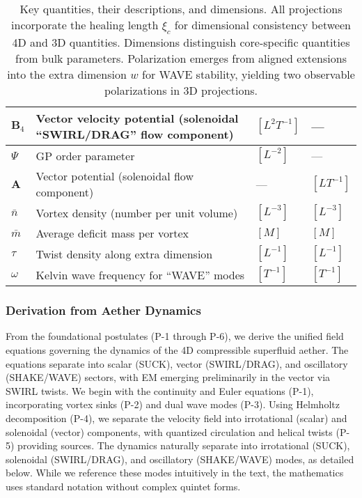 \begin{table}[H]
\begin{tabularx}{\textwidth}{|l|Y|l|l|}
\hline
$\mathbf{B}_4$ & Vector velocity potential (solenoidal ``SWIRL/DRAG'' flow component) & $[L^2 T^{-1}]$ & --- \\
\hline
$\Psi$ & GP order parameter & $[L^{-2}]$ & --- \\
\hline
$\mathbf{A}$ & Vector potential (solenoidal flow component) & --- & $[L T^{-1}]$ \\
\hline
$\bar{n}$ & Vortex density (number per unit volume) & $[L^{-3}]$ & $[L^{-3}]$ \\
\hline
$\bar{m}$ & Average deficit mass per vortex & $[M]$ & $[M]$ \\
\hline
$\tau$ & Twist density along extra dimension & $[L^{-1}]$ & $[L^{-1}]$ \\
\hline
$\omega$ & Kelvin wave frequency for ``WAVE'' modes & $[T^{-1}]$ & $[T^{-1}]$ \\
\hline
\end{tabularx}
\caption{Key quantities, their descriptions, and dimensions. All projections incorporate the healing length $\xi_c$ for dimensional consistency between 4D and 3D quantities. Dimensions distinguish core-specific quantities from bulk parameters. Polarization emerges from aligned extensions into the extra dimension $w$ for WAVE stability, yielding two observable polarizations in 3D projections.}
\label{tab:notation}
\end{table}

\subsubsection{Derivation from Aether Dynamics}

From the foundational postulates (P-1 through P-6), we derive the unified field equations governing the dynamics of the 4D compressible superfluid aether. The equations separate into scalar (SUCK), vector (SWIRL/DRAG), and oscillatory (SHAKE/WAVE) sectors, with EM emerging preliminarily in the vector via SWIRL twists. We begin with the continuity and Euler equations (P-1), incorporating vortex sinks (P-2) and dual wave modes (P-3). Using Helmholtz decomposition (P-4), we separate the velocity field into irrotational (scalar) and solenoidal (vector) components, with quantized circulation and helical twists (P-5) providing sources. The dynamics naturally separate into irrotational (SUCK), solenoidal (SWIRL/DRAG), and oscillatory (SHAKE/WAVE) modes, as detailed below. While we reference these modes intuitively in the text, the mathematics uses standard notation without complex quintet forms.

